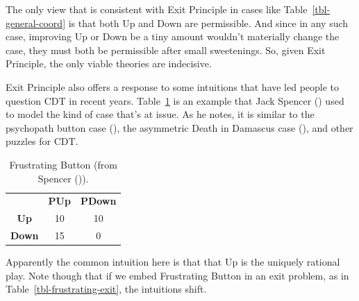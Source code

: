 \documentclass[
  12pt,
  letterpaper,
  DIV=11,
  numbers=noendperiod]{scrreprt}
\begin{document}
The only view that is consistent with Exit Principle in cases like
Table~\ref{tbl-general-coord} is that both Up and Down are permissible.
And since in any such case, improving Up or Down be a tiny amount
wouldn't materially change the case, they must both be permissible after
small sweetenings. So, given Exit Principle, the only viable theories
are indecisive.

Exit Principle also offers a response to some intuitions that have led
people to question CDT in recent years.
Table~\ref{tbl-frustrating-button} is an example that Jack Spencer
() used to model the kind of case that's
at issue. As he notes, it is similar to the psychopath button case
(), the asymmetric Death in
Damascus case (), and other
puzzles for CDT.

\begin{longtable}[]{@{}ccc@{}}
\caption{Frustrating Button (from Spencer
()).}\label{tbl-frustrating-button}\tabularnewline
\toprule\noalign{}
\endfirsthead
\endhead
\bottomrule\noalign{}
\endlastfoot
& \textbf{PUp} & \textbf{PDown} \\
\textbf{Up} & 10 & 10 \\
\textbf{Down} & 15 & 0 \\
\end{longtable}

Apparently the common intuition here is that that Up is the uniquely
rational play. Note though that if we embed Frustrating Button in an
exit problem, as in Table~\ref{tbl-frustrating-exit}, the intuitions
shift.
\end{document}
